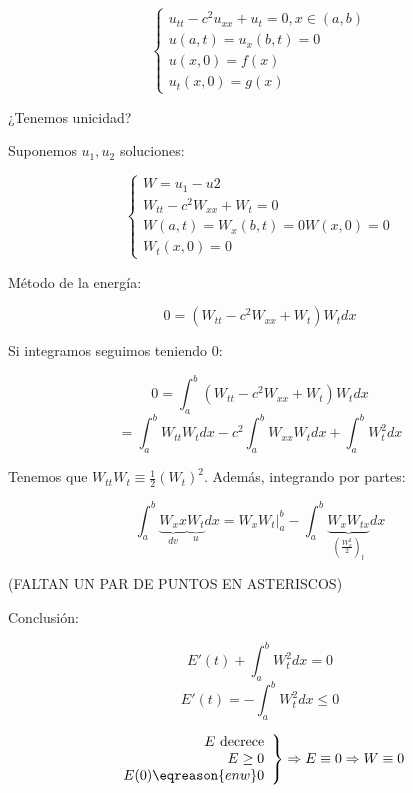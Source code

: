 			\begin{problem}

				\[\begin{cases}
					u_{tt} - c^2u_{xx} + u_t = 0, x \in (a,b)\\
					u(a,t) = u_x (b,t) = 0\\
					u(x,0) = f(x) \\
					u_t(x,0) = g(x)
				\end{cases}\]

				¿Tenemos unicidad?

				\solution

				Suponemos $u_1,u_2$ soluciones:

				\[ \begin{cases} W = u_1 - u2 \\
				W_{tt} - c^2 W_{xx} + W_t = 0 \\
				W(a,t) = W_x (b,t) = 0
				W(x,0) = 0\\
				W_t (x,0) = 0
				\end{cases}\]

				Método de la energía:

				\[ 0 = (W_{tt} - c^2 W_{xx} + W_t) W_t dx\]

				Si integramos seguimos teniendo 0:

				\[ 0 = \int_a^b (W_{tt} - c^2 W_{xx} + W_t) W_t dx\]
				\[ = \int_a^b W_{tt} W_t dx - c^2 \int^b_a W_{xx} W_t dx + \int_{a}^b W^2_t dx  \]

				Tenemos que $W_{tt}W_t \equiv \frac{1}{2} (W_t)^2 $. Además, integrando por partes:

				\[ \int_a^b \underbrace{W_xx}_{dv} \underbrace{W_t}_{u} dx = W_x W_t |_a^b - \int_a^b \underbrace{W_x W_{tx}}_{(\frac{W_x^2}{2})_t} dx \]

				(FALTAN UN PAR DE PUNTOS EN ASTERISCOS)

				Conclusión:

				\[ E'(t) + \int_a^b W_t^2 dx = 0\]
				\[ E'(t) = -\int_a^b W_t^2 dx \leq 0 \]

				\[ \left. \begin{array}{r}
					E \text{ decrece} \\
					E \geq 0 \\
					E(0) \eqreason{en w} 0 \end{array} \right\} \Rightarrow E \equiv 0 \Rightarrow W \equiv 0 \]

			\end{problem}

